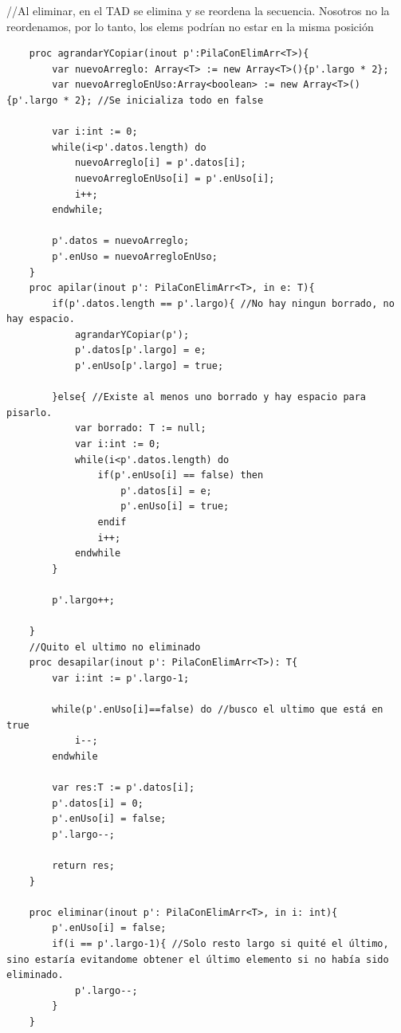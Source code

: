 \documentclass[10pt,a4paper]{article}
\begin{document}
//Al eliminar, en el TAD se elimina y se reordena la secuencia. Nosotros no la reordenamos, por lo tanto, los elems podrían no estar en la misma posición \\

\begin{lstlisting}
    proc agrandarYCopiar(inout p':PilaConElimArr<T>){
        var nuevoArreglo: Array<T> := new Array<T>(){p'.largo * 2};
        var nuevoArregloEnUso:Array<boolean> := new Array<T>(){p'.largo * 2}; //Se inicializa todo en false

        var i:int := 0;
        while(i<p'.datos.length) do
            nuevoArreglo[i] = p'.datos[i];
            nuevoArregloEnUso[i] = p'.enUso[i];
            i++;
        endwhile;
        
        p'.datos = nuevoArreglo;
        p'.enUso = nuevoArregloEnUso;
    }
    proc apilar(inout p': PilaConElimArr<T>, in e: T){
        if(p'.datos.length == p'.largo){ //No hay ningun borrado, no hay espacio.
            agrandarYCopiar(p');
            p'.datos[p'.largo] = e;
            p'.enUso[p'.largo] = true;

        }else{ //Existe al menos uno borrado y hay espacio para pisarlo. 
            var borrado: T := null;
            var i:int := 0;
            while(i<p'.datos.length) do
                if(p'.enUso[i] == false) then
                    p'.datos[i] = e;
                    p'.enUso[i] = true;
                endif 
                i++;
            endwhile 
        }

        p'.largo++; 

    }    
    //Quito el ultimo no eliminado
    proc desapilar(inout p': PilaConElimArr<T>): T{
        var i:int := p'.largo-1;

        while(p'.enUso[i]==false) do //busco el ultimo que está en true
            i--;
        endwhile
        
        var res:T := p'.datos[i];
        p'.datos[i] = 0;
        p'.enUso[i] = false;
        p'.largo--;

        return res;
    }

    proc eliminar(inout p': PilaConElimArr<T>, in i: int){
        p'.enUso[i] = false;
        if(i == p'.largo-1){ //Solo resto largo si quité el último, sino estaría evitandome obtener el último elemento si no había sido eliminado.
            p'.largo--;
        }
    }
\end{lstlisting}
\end{document}
